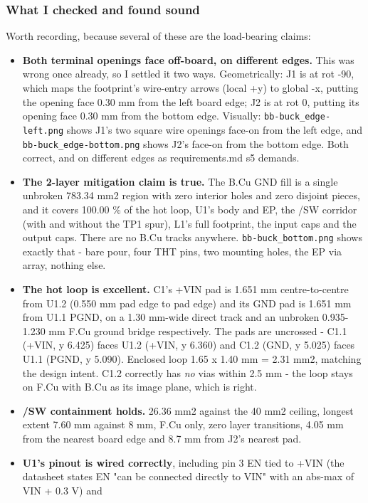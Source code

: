 \documentclass[11pt,a4paper]{article}
\begin{document}
\subsubsection*{What I checked and found sound}
Worth recording, because several of these are the load-bearing claims:

\begin{itemize}
\item \textbf{Both terminal openings face off-board, on different edges.} This was wrong once
already, so I settled it two ways. Geometrically: J1 is at rot -90, which maps the
footprint's wire-entry arrows (local +y) to global -x, putting the opening face
0.30 mm from the left board edge; J2 is at rot 0, putting its opening face 0.30 mm
from the bottom edge. Visually: \texttt{bb-buck\_edge-left.png} shows J1's two square wire
openings face-on from the left edge, and \texttt{bb-buck\_edge-bottom.png} shows J2's
face-on from the bottom edge. Both correct, and on different edges as
requirements.md s5 demands.
\item \textbf{The 2-layer mitigation claim is true.} The B.Cu GND fill is a single unbroken
783.34 mm2 region with zero interior holes and zero disjoint pieces, and it covers
100.00 \% of the hot loop, U1's body and EP, the /SW corridor (with and without the
TP1 spur), L1's full footprint, the input caps and the output caps. There are no
B.Cu tracks anywhere. \texttt{bb-buck\_bottom.png} shows exactly that - bare pour, four THT
pins, two mounting holes, the EP via array, nothing else.
\item \textbf{The hot loop is excellent.} C1's +VIN pad is 1.651 mm centre-to-centre from
U1.2 (0.550 mm pad edge to pad edge) and its GND pad is 1.651 mm from U1.1 PGND, on
a 1.30 mm-wide direct track and an unbroken 0.935-1.230 mm F.Cu ground bridge
respectively. The pads are uncrossed - C1.1 (+VIN, y 6.425) faces U1.2 (+VIN,
y 6.360) and C1.2 (GND, y 5.025) faces U1.1 (PGND, y 5.090). Enclosed loop
1.65 x 1.40 mm = 2.31 mm2, matching the design intent. C1.2 correctly has \emph{no} vias
within 2.5 mm - the loop stays on F.Cu with B.Cu as its image plane, which is right.
\item \textbf{/SW containment holds.} 26.36 mm2 against the 40 mm2 ceiling, longest extent
7.60 mm against 8 mm, F.Cu only, zero layer transitions, 4.05 mm from the nearest
board edge and 8.7 mm from J2's nearest pad.
\item \textbf{U1's pinout is wired correctly}, including pin 3 EN tied to +VIN (the datasheet
states EN "can be connected directly to VIN" with an abs-max of VIN + 0.3 V) and

\end{itemize}
\end{document}
